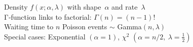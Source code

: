 \documentclass[preview]{standalone}
\begin{document}
Density $f(x;\alpha,\lambda)$ with shape $\alpha$ and rate $\lambda$\\Γ‑function links to factorial: $\Gamma(n)=(n-1)!$\\Waiting time to $n$ Poisson events $\sim$ Gamma$(n,\lambda)$\\Special cases: Exponential $(\alpha=1)$, $\chi^2$ $(\alpha=n/2,\ \lambda=\tfrac12)$\\
\end{document}

